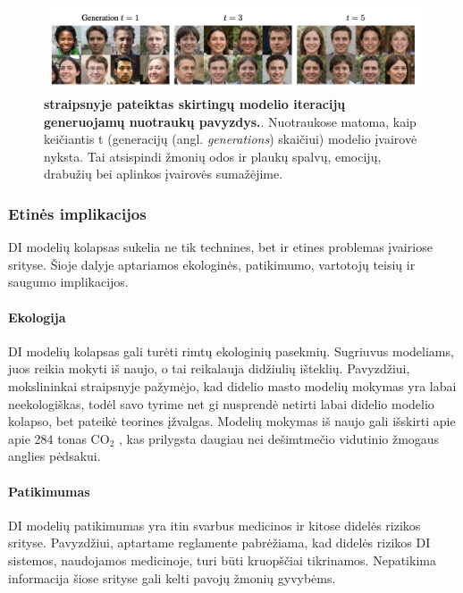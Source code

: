 \documentclass{VUMIFInfKursinis}
\begin{document}
\begin{figure}[H]
    \centering
    \includegraphics[scale=0.5]{img/nuotraukuKolapsas.png}
    \caption{\textbf{\cite{ModelsGoMAD} straipsnyje pateiktas skirtingų modelio iteracijų generuojamų nuotraukų pavyzdys.}. Nuotraukose matoma, kaip keičiantis t (generacijų (angl. \textsl{generations}) skaičiui) modelio įvairovė nyksta. Tai atsispindi žmonių odos ir plaukų spalvų, emocijų, drabužių bei aplinkos įvairovės sumažėjime.}  
    \label{img:nuotraukuKolapsas}
\end{figure}

\subsubsection{Etinės implikacijos}

DI modelių kolapsas sukelia ne tik technines, bet ir etines problemas įvairiose srityse. Šioje dalyje aptariamos ekologinės, patikimumo, vartotojų teisių ir saugumo implikacijos.

\paragraph{Ekologija} 
DI modelių kolapsas gali turėti rimtų ekologinių pasekmių. Sugriuvus modeliams, juos reikia mokyti iš naujo, o tai reikalauja didžiulių išteklių. Pavyzdžiui, mokslininkai straipsnyje \cite{AICollapseNature} pažymėjo, kad didelio masto modelių mokymas yra labai neekologiškas, todėl savo tyrime net gi nusprendė netirti labai didelio modelio kolapso, bet pateikė teorines įžvalgas. Modelių mokymas iš naujo gali išskirti apie apie 284 tonas CO$_2$ \cite{energy_2019}, kas prilygsta daugiau nei dešimtmečio vidutinio žmogaus anglies pėdsakui.


\paragraph{Patikimumas} 
DI modelių patikimumas yra itin svarbus medicinos ir kitose didelės rizikos srityse. Pavyzdžiui, aptartame reglamente \cite{AIEuropeanAct} pabrėžiama, kad didelės rizikos DI sistemos, naudojamos medicinoje, turi būti kruopščiai tikrinamos. Nepatikima informacija šiose srityse gali kelti pavojų žmonių gyvybėms. 
\end{document}
